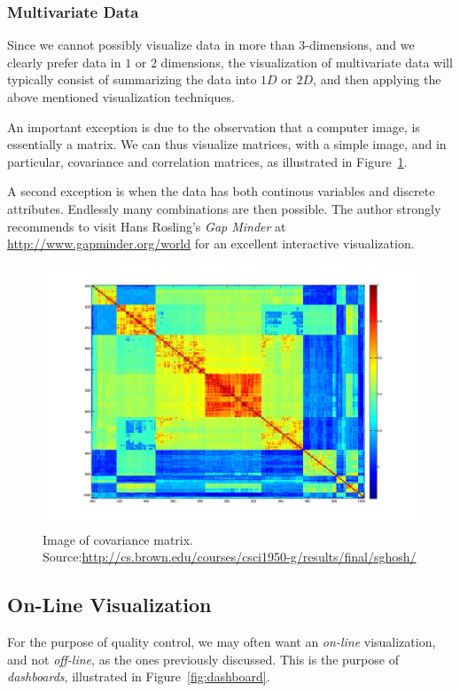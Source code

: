 \documentclass[12pt,a4paper]{report}
\begin{document}
\subsubsection{Multivariate Data}
Since we cannot possibly visualize data in more than $3$-dimensions, and we clearly prefer data in $1$ or $2$ dimensions, the visualization of multivariate data will typically consist of summarizing the data into $1D$ or $2D$, and then applying the above mentioned visualization techniques.

An important exception is due to the observation that a computer image, is essentially a matrix. 
We can thus visualize matrices, with a simple image, and in particular, covariance and correlation matrices, as illustrated in Figure~\ref{fig:covariance_image}.

A second exception is when the data has both continous variables and discrete attributes. 
Endlessly many combinations are then possible.
The author strongly recommends to visit Hans Rosling's \emph{Gap Minder} at \url{http://www.gapminder.org/world} for an excellent interactive visualization. 


\begin{figure}[h]
\centering
\includegraphics[height=0.3\textheight]{art/covarianceSupervised}
\caption[Covariance Matrix]{Image of covariance matrix. Source:\url{http://cs.brown.edu/courses/csci1950-g/results/final/sghosh/}}
\label{fig:covariance_image}
\end{figure}




\subsection{On-Line Visualization}
For the purpose of quality control, we may often want an \emph{on-line} visualization, and not \emph{off-line}, as the ones previously discussed.
This is the purpose of \emph{dashboards}, illustrated in Figure~\ref{fig:dashboard}.
\end{document}
